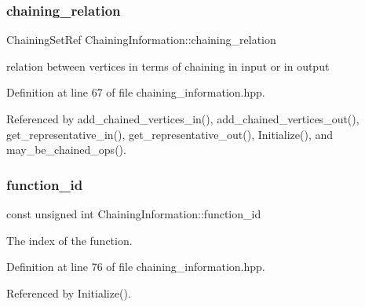 \mbox{\label{classChainingInformation_a545635d444ebb7543ffef61b3f11bb0e}} 
\subsubsection{\texorpdfstring{chaining\+\_\+relation}{chaining\_relation}}
{\footnotesize\ttfamily Chaining\+Set\+Ref Chaining\+Information\+::chaining\+\_\+relation\hspace{0.3cm}{\ttfamily [protected]}}



relation between vertices in terms of chaining in input or in output 



Definition at line 67 of file chaining\+\_\+information.\+hpp.



Referenced by add\+\_\+chained\+\_\+vertices\+\_\+in(), add\+\_\+chained\+\_\+vertices\+\_\+out(), get\+\_\+representative\+\_\+in(), get\+\_\+representative\+\_\+out(), Initialize(), and may\+\_\+be\+\_\+chained\+\_\+ops().

\mbox{\label{classChainingInformation_af6b3dc65f580c0e11c3e7ec52ab9f852}} 
\subsubsection{\texorpdfstring{function\+\_\+id}{function\_id}}
{\footnotesize\ttfamily const unsigned int Chaining\+Information\+::function\+\_\+id\hspace{0.3cm}{\ttfamily [protected]}}



The index of the function. 



Definition at line 76 of file chaining\+\_\+information.\+hpp.



Referenced by Initialize().

\mbox{\label{classChainingInformation_a47af998080762385042e518b2605a5da}} 
